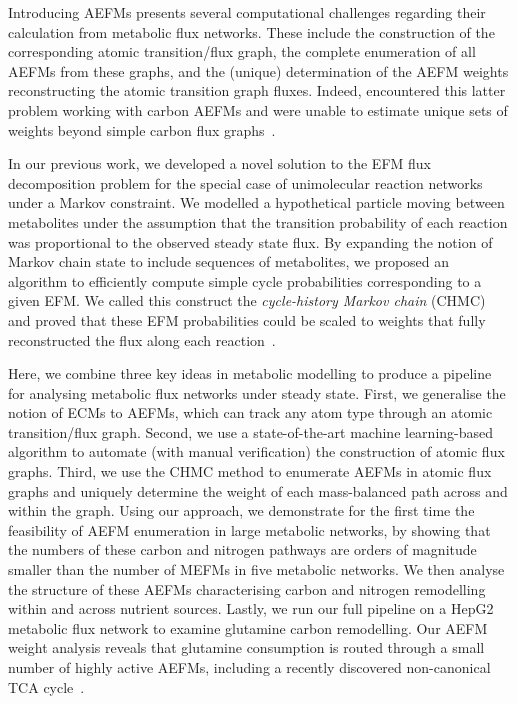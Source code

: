 \documentclass[12pt]{article}
\begin{document}
Introducing AEFMs presents several computational challenges regarding
their calculation from metabolic flux networks. These include the
construction of the corresponding atomic transition/flux graph, the
complete enumeration of all AEFMs from these graphs, and the (unique)
determination of the AEFM weights reconstructing the atomic transition
graph fluxes. Indeed, \citeauthor{PeyJon2012Itmd} encountered this latter
problem working with carbon AEFMs and were unable to estimate unique sets
of weights beyond simple carbon flux graphs~\citep{PeyJon2012Itmd}.

In our previous work, we developed a novel solution to the EFM flux
decomposition problem for the special case of unimolecular reaction
networks under a Markov constraint. We modelled a hypothetical particle
moving between metabolites under the assumption that the transition
probability of each reaction was proportional to the observed steady state
flux. By expanding the notion of Markov chain state to include sequences
of metabolites, we proposed an algorithm to efficiently compute simple
cycle probabilities corresponding to a given EFM. We called this construct
the \emph{cycle-history Markov chain} (CHMC) and proved that these EFM
probabilities could be scaled to weights that fully reconstructed the flux
along each reaction~\citep{ChitpinJustinG2023AMct}.

Here, we combine three key ideas in metabolic modelling to produce
a pipeline for analysing metabolic flux networks under steady state.
First, we generalise the notion of ECMs to AEFMs, which can track any atom
type through an atomic transition/flux graph. Second, we use
a state-of-the-art machine learning-based algorithm to automate (with
manual verification) the construction of atomic flux graphs. Third, we use
the CHMC method to enumerate AEFMs in atomic flux graphs and uniquely
determine the weight of each mass-balanced path across and within the
graph. Using our approach, we demonstrate for the first time the
feasibility of AEFM enumeration in large metabolic networks, by showing
that the numbers of these carbon and nitrogen pathways are orders of
magnitude smaller than the number of MEFMs in five metabolic networks. We
then analyse the structure of these AEFMs characterising carbon and
nitrogen remodelling within and across nutrient sources. Lastly, we run
our full pipeline on a HepG2 metabolic flux network to examine glutamine
carbon remodelling. Our AEFM weight analysis reveals that glutamine
consumption is routed through a small number of highly active AEFMs,
including a recently discovered non-canonical TCA
cycle~\citep{ArnoldPaigeK2022Anta}.
\end{document}
